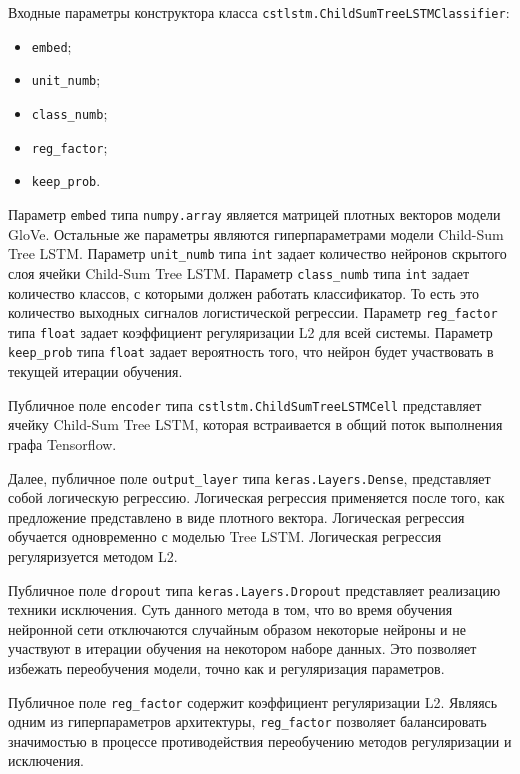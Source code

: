 Входные параметры конструктора класса \texttt{cstlstm.ChildSumTree\-LSTM\-Classifier}:
\begin{itemize}
\item \texttt{embed};
\item \texttt{unit\_numb};
\item \texttt{class\_numb};
\item \texttt{reg\_factor};
\item \texttt{keep\_prob}.
\end{itemize}

Параметр \texttt{embed} типа \texttt{numpy.array} является матрицей плотных векторов модели GloVe. Остальные же параметры являются гиперпараметрами модели Child-Sum Tree LSTM\@. Параметр \texttt{unit\_numb} типа \texttt{int} задает количество нейронов скрытого слоя ячейки Child-Sum Tree LSTM\@. Параметр \texttt{class\_numb} типа \texttt{int} задает количество классов, с которыми должен работать классификатор. То есть это количество выходных сигналов логистической регрессии. Параметр \texttt{reg\_factor} типа \texttt{float} задает коэффициент регуляризации L2 для всей системы. Параметр \texttt{keep\_prob} типа \texttt{float} задает вероятность того, что нейрон будет участвовать в текущей итерации обучения.

Публичное поле \texttt{encoder} типа \texttt{cstlstm.ChildSumTreeLSTMCell} представляет ячейку Child-Sum Tree LSTM, которая встраивается в общий поток выполнения графа Tensorflow.

Далее, публичное поле \texttt{output\_layer} типа \texttt{keras.Layers.Dense}, представляет собой логическую регрессию. Логическая регрессия применяется после того, как предложение представлено в виде плотного вектора. Логическая регрессия обучается одновременно с моделью Tree LSTM\@. Логическая регрессия регуляризуется методом L2.

Публичное поле \texttt{dropout} типа \texttt{keras.Layers.Dropout} представляет реализацию техники исключения. Суть данного метода в том, что во время обучения нейронной сети отключаются случайным образом некоторые нейроны и не участвуют в итерации обучения на некотором наборе данных. Это позволяет избежать переобучения модели, точно как и регуляризация параметров.

Публичное поле \texttt{reg\_factor} содержит коэффициент регуляризации L2. Являясь одним из гиперпараметров архитектуры, \texttt{reg\_factor} позволяет балансировать значимостью в процессе противодействия переобучению методов регуляризации и исключения.

